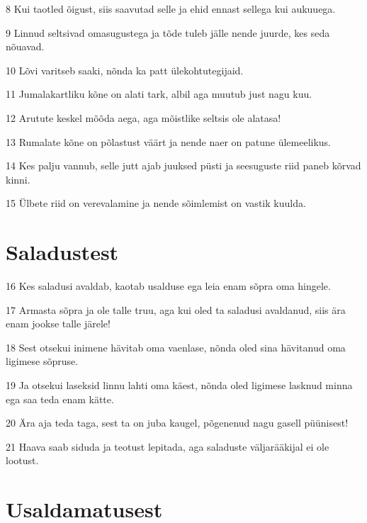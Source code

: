 \par 8 Kui taotled õigust, siis saavutad selle ja ehid ennast sellega kui aukuuega.
\par 9 Linnud seltsivad omasugustega ja tõde tuleb jälle nende juurde, kes seda nõuavad.
\par 10 Lõvi varitseb saaki, nõnda ka patt ülekohtutegijaid.
\par 11 Jumalakartliku kõne on alati tark, albil aga muutub just nagu kuu.
\par 12 Arutute keskel mõõda aega, aga mõistlike seltsis ole alatasa!
\par 13 Rumalate kõne on põlastust väärt ja nende naer on patune ülemeelikus.
\par 14 Kes palju vannub, selle jutt ajab juuksed püsti ja seesuguste riid paneb kõrvad kinni.
\par 15 Ülbete riid on verevalamine ja nende sõimlemist on vastik kuulda.

\section*{Saladustest}

\par 16 Kes saladusi avaldab, kaotab usalduse ega leia enam sõpra oma hingele.
\par 17 Armasta sõpra ja ole talle truu, aga kui oled ta saladusi avaldanud, siis ära enam jookse talle järele!
\par 18 Sest otsekui inimene hävitab oma vaenlase, nõnda oled sina hävitanud oma ligimese sõpruse.
\par 19 Ja otsekui laseksid linnu lahti oma käest, nõnda oled ligimese lasknud minna ega saa teda enam kätte.
\par 20 Ära aja teda taga, sest ta on juba kaugel, põgenenud nagu gasell püünisest!
\par 21 Haava saab siduda ja teotust lepitada, aga saladuste väljarääkijal ei ole lootust.

\section*{Usaldamatusest}

